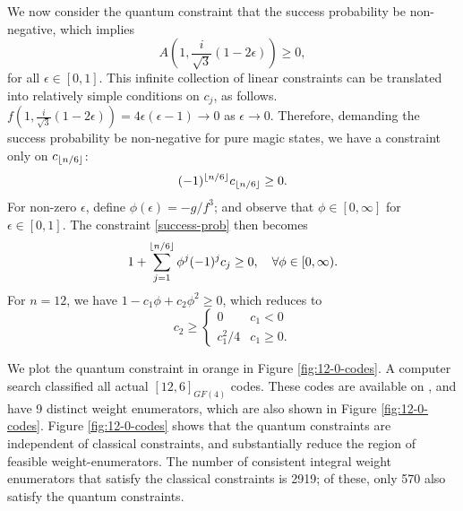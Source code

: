 \documentclass[11pt]{article}
\DeclarePairedDelimiter\floor{\lfloor}{\rfloor}
\begin{document}
We now consider the quantum constraint that the success probability be non-negative, which implies 
\begin{equation}
    A(1,\frac{i}{\sqrt{3}}(1-2\epsilon))\geq 0, \label{success-prob}
\end{equation} 
for all $\epsilon \in [0,1]$. This infinite collection of linear constraints can be translated into relatively simple conditions on $c_j$, as follows. $f(1,\frac{i}{\sqrt{3}}(1-2\epsilon)) = 4\epsilon(\epsilon-1) \to 0$ as $\epsilon \to 0$. Therefore, demanding the success probability be non-negative for pure magic states, we have a constraint only on $c_{\floor{n/6}}$:  
\begin{equation}
(-1)^{\floor{n/6}} c_{\floor{n/6}} \geq 0.
\end{equation} 
For non-zero $\epsilon$, define $\phi(\epsilon)=-g/f^3$; and observe that $\phi \in [0, \infty]$ for $\epsilon \in [0,1]$. The constraint \eqref{success-prob} then becomes 
\begin{equation}
    1+\sum_{j=1}^{\floor{n/6}}\phi^j (-1)^jc_j \geq 0, \quad \forall \phi \in [0,\infty).
\end{equation}
For $n=12$, we have $1-c_1 \phi + c_2 \phi^2 \geq 0$, which reduces to
\begin{equation}
    c_2 \geq \begin{cases}
         0 & c_1 <0 \\
         c_1^2/4 & c_1 \geq 0.
    \end{cases}
\end{equation}

We plot the quantum constraint in orange in Figure \ref{fig:12-0-codes}. A computer search \cite{macwilliams1978self} classified all actual $[12,6]_{GF(4)}$ codes.  These codes are available on \cite{munemasa_codes_website}, and have 9 distinct weight enumerators, which are also shown in Figure \ref{fig:12-0-codes}. Figure \ref{fig:12-0-codes} shows that the quantum constraints are independent of classical constraints, and substantially reduce the region of feasible weight-enumerators. The number of consistent integral weight enumerators that satisfy the classical constraints is 2919; of these, only 570 also satisfy the quantum constraints.
\end{document}
